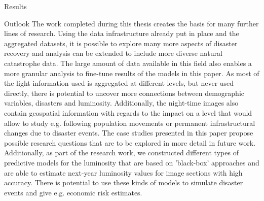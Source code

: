 \documentclass[12.5pt,fleqn,leqno,letterpaper]{article}
\begin{document}
\begin{section}{Results}
  \begin{subsection}{Outlook}
    The work completed during this thesis creates the basis for many further lines of research. Using the data infrastructure already put in place and the aggregated datasets, it is possible to explore many more aspects of disaster recovery and analysis can be extended to include more diverse natural catastrophe data. The large amount of data available in this field also enables a more granular analysis to fine-tune results of the models in this paper. As most of the light information used is aggregated at different levels, but never used directly, there is potential to uncover more connections between demographic variables, disasters and luminosity. Additionally, the night-time images also contain geospatial information with regards to the impact on a level that would allow to study e.g. following population movements or permanent infrastructural changes due to disaster events. The case studies presented in this paper propose possible research questions that are to be explored in more detail in future work. Additionally, as part of the research work, we constructed different types of predictive models for the luminosity that are based on 'black-box' approaches and are able to estimate next-year luminosity values for image sections with high accuracy. There is potential to use these kinds of models to simulate disaster events and give e.g. economic risk estimates.
  \end{subsection}

\end{section}
\end{document}
